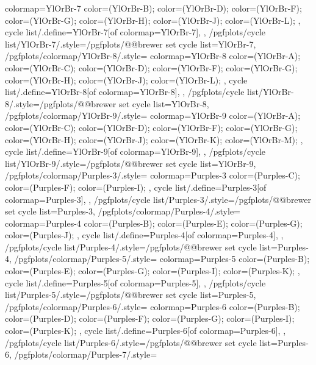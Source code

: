 {{    colormap={YlOrBr-7}{
      color=(YlOrBr-B);
      color=(YlOrBr-D);
      color=(YlOrBr-F);
      color=(YlOrBr-G);
      color=(YlOrBr-H);
      color=(YlOrBr-J);
      color=(YlOrBr-L);
    },
    cycle list/.define={YlOrBr-7}{[of colormap=YlOrBr-7]},
  },
  /pgfplots/cycle list/YlOrBr-7/.style={/pgfplots/@@brewer set cycle list={YlOrBr-7}},
  /pgfplots/colormap/YlOrBr-8/.style={
    colormap={YlOrBr-8}{
      color=(YlOrBr-A);
      color=(YlOrBr-C);
      color=(YlOrBr-D);
      color=(YlOrBr-F);
      color=(YlOrBr-G);
      color=(YlOrBr-H);
      color=(YlOrBr-J);
      color=(YlOrBr-L);
    },
    cycle list/.define={YlOrBr-8}{[of colormap=YlOrBr-8]},
  },
  /pgfplots/cycle list/YlOrBr-8/.style={/pgfplots/@@brewer set cycle list={YlOrBr-8}},
  /pgfplots/colormap/YlOrBr-9/.style={
    colormap={YlOrBr-9}{
      color=(YlOrBr-A);
      color=(YlOrBr-C);
      color=(YlOrBr-D);
      color=(YlOrBr-F);
      color=(YlOrBr-G);
      color=(YlOrBr-H);
      color=(YlOrBr-J);
      color=(YlOrBr-K);
      color=(YlOrBr-M);
    },
    cycle list/.define={YlOrBr-9}{[of colormap=YlOrBr-9]},
  },
  /pgfplots/cycle list/YlOrBr-9/.style={/pgfplots/@@brewer set cycle list={YlOrBr-9}},
  /pgfplots/colormap/Purples-3/.style={
    colormap={Purples-3}{
      color=(Purples-C);
      color=(Purples-F);
      color=(Purples-I);
    },
    cycle list/.define={Purples-3}{[of colormap=Purples-3]},
  },
  /pgfplots/cycle list/Purples-3/.style={/pgfplots/@@brewer set cycle list={Purples-3}},
  /pgfplots/colormap/Purples-4/.style={
    colormap={Purples-4}{
      color=(Purples-B);
      color=(Purples-E);
      color=(Purples-G);
      color=(Purples-J);
    },
    cycle list/.define={Purples-4}{[of colormap=Purples-4]},
  },
  /pgfplots/cycle list/Purples-4/.style={/pgfplots/@@brewer set cycle list={Purples-4}},
  /pgfplots/colormap/Purples-5/.style={
    colormap={Purples-5}{
      color=(Purples-B);
      color=(Purples-E);
      color=(Purples-G);
      color=(Purples-I);
      color=(Purples-K);
    },
    cycle list/.define={Purples-5}{[of colormap=Purples-5]},
  },
  /pgfplots/cycle list/Purples-5/.style={/pgfplots/@@brewer set cycle list={Purples-5}},
  /pgfplots/colormap/Purples-6/.style={
    colormap={Purples-6}{
      color=(Purples-B);
      color=(Purples-D);
      color=(Purples-F);
      color=(Purples-G);
      color=(Purples-I);
      color=(Purples-K);
    },
    cycle list/.define={Purples-6}{[of colormap=Purples-6]},
  },
  /pgfplots/cycle list/Purples-6/.style={/pgfplots/@@brewer set cycle list={Purples-6}},
  /pgfplots/colormap/Purples-7/.style={
}}

